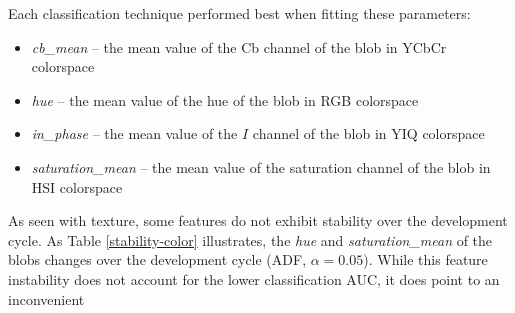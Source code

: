 \documentclass[letterpaper]{article}
\begin{document}
{{
%


}

Each classification technique performed best when fitting these parameters:
\begin{itemize}
	\item{\textit{cb\_mean} -- the mean value of the Cb channel of the blob in YCbCr colorspace}
	\item{\textit{hue} -- the mean value of the hue of the blob in RGB colorspace}
	\item{\textit{in\_phase} -- the mean value of the $I$ channel of the blob in YIQ colorspace}
	\item{\textit{saturation\_mean} -- the mean value of the saturation channel of the blob in HSI colorspace}
\end{itemize}

As seen with texture, some features do not exhibit stability over the development cycle. As Table \ref{stability-color} illustrates, the \textit{hue} and \textit{saturation\_mean} of the blobs changes over the development cycle (ADF, $\alpha = 0.05$). While this feature instability does not account for the lower classification AUC, it does point to an inconvenient

}
\end{document}
